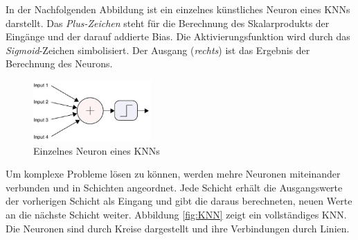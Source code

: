 In der Nachfolgenden Abbildung ist ein einzelnes künstliches Neuron eines \acp{KNN} darstellt. Das \emph{Plus-Zeichen} steht für die Berechnung des Skalarprodukts der Eingänge und der darauf addierte Bias. Die Aktivierungsfunktion wird durch das \emph{Sigmoid}-Zeichen simbolisiert. Der Ausgang (\emph{rechts}) ist das Ergebnis der Berechnung des Neurons. \cite{visualApproach}

\begin{figure}[H]
   \centering
   \includegraphics[width=0.4\textwidth]{images/KNNs/Neuron.png}
   \caption{Einzelnes Neuron eines \acp{KNN} \cite{visualApproach}}
\end{figure}

Um komplexe Probleme lösen zu können, werden mehre Neuronen miteinander verbunden und in Schichten angeordnet. Jede Schicht erhält die Ausgangswerte der vorherigen Schicht als Eingang und gibt die daraus berechneten, neuen Werte an die nächste Schicht weiter. Abbildung \ref{fig:KNN} zeigt ein vollständiges \ac{KNN}. Die Neuronen sind durch Kreise dargestellt und ihre Verbindungen durch Linien. \cite{knnsKompakt} 

